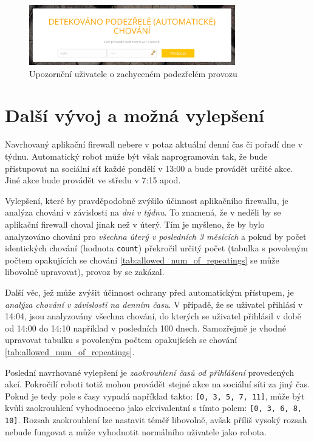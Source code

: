 \begin{figure}[H]
	\centering
	\includegraphics[width=0.8\textwidth]{images/bad_behaviour.jpg}
	\caption{Upozornění uživatele o zachyceném podezřelém provozu}
	\label{img:bad_behaviour}
\end{figure}

\section{Další vývoj a možná vylepšení}
Navrhovaný aplikační firewall nebere v potaz aktuální denní čas či pořadí dne v týdnu. Automatický robot může být však naprogramován tak, že bude přistupovat na sociální síť každé pondělí v 13:00 a bude provádět určité akce. Jiné akce bude provádět ve středu v 7:15 apod.

Vylepšení, které by pravděpodobně zvýšilo účinnost aplikačního firewallu, je analýza chování v závislosti na \textit{dni v týdnu}. To znamená, že v neděli by se aplikační firewall choval jinak než v úterý. Tím je myšleno, že by bylo analyzováno chování pro \textit{všechna úterý v posledních 3 měsících} a pokud by počet identických chování (hodnota \texttt{count}) překročil určitý počet (tabulka s povoleným počtem opakujících se chování \ref{tab:allowed_num_of_repeatings} se může libovolně upravovat), provoz by se zakázal. 

Další věc, jež může zvýšit účinnost ochrany před automatickým přístupem, je \textit{analýza chování v závislosti na denním času}. V případě, že se uživatel přihlásí v 14:04, jsou analyzovány všechna chování, do kterých se uživatel přihlásil v době od 14:00 do 14:10 například v posledních 100 dnech. Samozřejmě je vhodné upravovat tabulku s povoleným počtem opakujících se chování \ref{tab:allowed_num_of_repeatings}. 

Poslední navrhované vylepšení je \textit{zaokrouhlení časů od přihlášení} provedených akcí. Pokročilí roboti totiž mohou provádět stejné akce na sociální síti za jiný čas. Pokud je tedy pole s časy vypadá například takto: \texttt{[0, 3, 5, 7, 11]}, může být kvůli zaokrouhlení vyhodnoceno jako ekvivalentní s tímto polem: \texttt{[0, 3, 6, 8, 10]}. Rozsah zaokrouhlení lze nastavit téměř libovolně, avšak příliš vysoký rozsah nebude fungovat a může vyhodnotit normálního uživatele jako robota.

